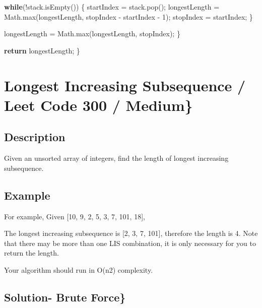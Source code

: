 \documentclass[]{book}
\newenvironment{Shaded}{\begin{snugshade}}{\end{snugshade}}
\newcommand{\BuiltInTok}[1]{#1}
\newcommand{\DecValTok}[1]{\textcolor[rgb]{0.00,0.00,0.81}{#1}}
\newcommand{\FunctionTok}[1]{\textcolor[rgb]{0.00,0.00,0.00}{#1}}
\newcommand{\KeywordTok}[1]{\textcolor[rgb]{0.13,0.29,0.53}{\textbf{#1}}}
\newcommand{\NormalTok}[1]{#1}
\begin{document}
\begin{Shaded}
\begin{Highlighting}[]
        \KeywordTok{while}\NormalTok{(!stack.}\FunctionTok{isEmpty}\NormalTok{()) \{}
\NormalTok{            startIndex = stack.}\FunctionTok{pop}\NormalTok{();}
\NormalTok{            longestLength = }\BuiltInTok{Math}\NormalTok{.}\FunctionTok{max}\NormalTok{(longestLength, stopIndex - startIndex - }\DecValTok{1}\NormalTok{);}
\NormalTok{            stopIndex = startIndex;}
\NormalTok{        \}}

\NormalTok{        longestLength = }\BuiltInTok{Math}\NormalTok{.}\FunctionTok{max}\NormalTok{(longestLength, stopIndex);}
\NormalTok{    \}}

    \KeywordTok{return}\NormalTok{ longestLength;}
\NormalTok{\}}
\end{Highlighting}
\end{Shaded}

\hypertarget{longest-increasing-subsequence-leet-code-300-medium}{%
\section{Longest Increasing Subsequence / Leet Code 300 / Medium\}}\label{longest-increasing-subsequence-leet-code-300-medium}}

\hypertarget{description-28}{%
\subsection{Description}\label{description-28}}

Given an unsorted array of integers, find the length of longest increasing subsequence.

\hypertarget{example-27}{%
\subsection{Example}\label{example-27}}

For example, Given {[}10, 9, 2, 5, 3, 7, 101, 18{]},

The longest increasing subsequence is {[}2, 3, 7, 101{]}, therefore the length is 4. Note that there may be more than one
LIS combination, it is only necessary for you to return the length.

Your algorithm should run in O(n2) complexity.

\hypertarget{solution--brute-force}{%
\subsection{Solution- Brute Force\}}\label{solution--brute-force}}
\end{document}
